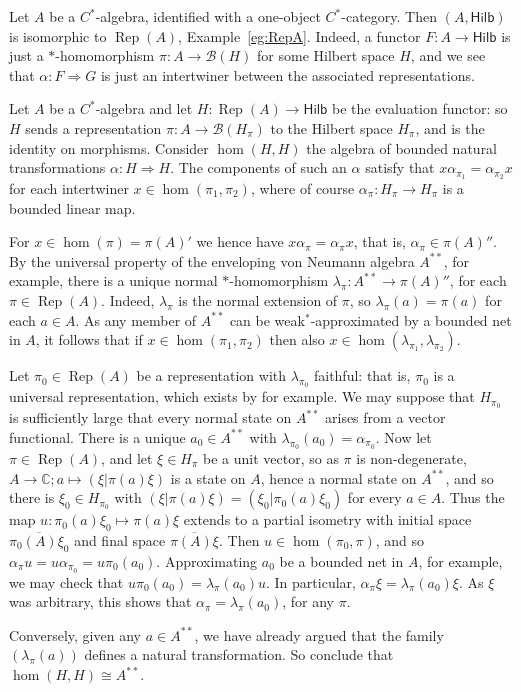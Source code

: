 \documentclass[a4paper,11pt]{article}
\theoremstyle{plain}
\theoremstyle{remark}
\newenvironment{example}
  {\pushQED{\qed}\renewcommand{\qedsymbol}{$\triangle$}\examplex}
  {\popQED\endexamplex}
\newcommand{\mc}[1]{\mathcal{#1}}
\newcommand{\catHilb}{\textsf{Hilb}}
\newcommand{\Rep}{\operatorname{Rep}}
\begin{document}
\begin{example}
Let $A$ be a $C^*$-algebra, identified with a one-object $C^*$-category.  Then $(A, \catHilb)$ is isomorphic to $\Rep(A)$, Example~\ref{eg:RepA}.  Indeed, a functor $F\colon A\to\catHilb$ is just a $*$-homomorphism $\pi\colon A\to\mc B(H)$ for some Hilbert space $H$, and we see that $\alpha\colon F\Rightarrow G$ is just an intertwiner between the associated representations.
\end{example}

\begin{example}
Let $A$ be a $C^*$-algebra and let $H\colon \Rep(A) \to \catHilb$ be the evaluation functor: so $H$ sends a representation $\pi\colon A\to\mc B(H_\pi)$ to the Hilbert space $H_\pi$, and is the identity on morphisms.  Consider $\hom(H,H)$ the algebra of bounded natural transformations $\alpha \colon H \Rightarrow H$.  The components of such an $\alpha$ satisfy that $x \alpha_{\pi_1} = \alpha_{\pi_2} x$ for each intertwiner $x\in\hom(\pi_1,\pi_2)$, where of course $\alpha_{\pi} \colon H_\pi \to H_\pi$ is a bounded linear map.

For $x\in\hom(\pi) = \pi(A)'$ we hence have $x \alpha_\pi = \alpha_\pi x$, that is, $\alpha_\pi \in \pi(A)''$.  By the universal property of the enveloping von Neumann algebra $A^{**}$, \cite[Lemma~III.2.2]{TakesakiI} for example, there is a unique normal $*$-homomorphism $\lambda_\pi \colon A^{**} \to \pi(A)''$, for each $\pi\in\Rep(A)$.  Indeed, $\lambda_\pi$ is the normal extension of $\pi$, so $\lambda_\pi(a) = \pi(a)$ for each $a\in A$.  As any member of $A^{**}$ can be weak$^*$-approximated by a bounded net in $A$, it follows that if $x\in\hom(\pi_1,\pi_2)$ then also $x \in \hom(\lambda_{\pi_1}, \lambda_{\pi_2})$.

Let $\pi_0\in\Rep(A)$ be a representation with $\lambda_{\pi_0}$ faithful: that is, $\pi_0$ is a universal representation, which exists by \cite[Theorem~III.2.4]{TakesakiI} for example.  We may suppose that $H_{\pi_0}$ is sufficiently large that every normal state on $A^{**}$ arises from a vector functional.  There is a unique $a_0 \in A^{**}$ with $\lambda_{\pi_0}(a_0) = \alpha_{\pi_0}$.  Now let $\pi\in\Rep(A)$, and let $\xi\in H_\pi$ be a unit vector, so as $\pi$ is non-degenerate, $A \to \mathbb C; a \mapsto (\xi|\pi(a)\xi)$ is a state on $A$, hence a normal state on $A^{**}$, and so there is $\xi_0 \in H_{\pi_0}$ with $(\xi|\pi(a)\xi) = (\xi_0 | \pi_0(a)\xi_0)$ for every $a\in A$.  Thus the map $u \colon \pi_0(a) \xi_0 \mapsto \pi(a)\xi$ extends to a partial isometry with initial space $\overline{\pi_0(A)\xi_0}$ and final space $\overline{\pi(A)\xi}$.  Then $u \in \hom(\pi_0, \pi)$, and so $\alpha_\pi u = u \alpha_{\pi_0} = u \pi_0(a_0)$.  Approximating $a_0$ be a bounded net in $A$, for example, we may check that $u \pi_0(a_0) = \lambda_\pi(a_0) u$.  In particular, $\alpha_\pi \xi = \lambda_\pi(a_0) \xi$.  As $\xi$ was arbitrary, this shows that $\alpha_\pi = \lambda_\pi(a_0)$, for any $\pi$.

Conversely, given any $a\in A^{**}$, we have already argued that the family $(\lambda_\pi(a))$ defines a natural transformation.  So conclude that $\hom(H,H) \cong A^{**}$.
\end{example}
\end{document}
